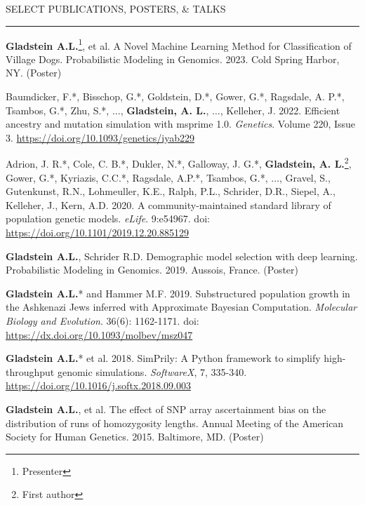 \documentclass{resume} %
\renewenvironment{rSection}[1]{
\sectionskip
\textcolor{RoyalPurple}{\MakeUppercase{#1}}
\sectionlineskip
\hrule
\begin{list}{}{
\setlength{\leftmargin}{1.5em}
}
\item[]
}{
\end{list}
}
\begin{document}
\begin{rSection}{Select Publications, Posters, \& Talks}

    \item \textbf{Gladstein A.L.}\footnote{Presenter}, et al. A Novel Machine Learning Method for Classification of Village Dogs.  Probabilistic Modeling in Genomics. 2023. Cold Spring Harbor, NY. (Poster)

    \item Baumdicker, F.*, Bisschop, G.*, Goldstein, D.*, Gower, G.*, Ragsdale, A. P.*, Tsambos, G.*, Zhu, S.*, $\ldots$, \textbf{Gladstein, A. L.}, $\ldots$, Kelleher, J. 2022. Efficient ancestry and mutation simulation with msprime 1.0. \textit{Genetics}. Volume 220, Issue 3. \url{https://doi.org/10.1093/genetics/iyab229}

    \item Adrion, J. R.*, Cole, C. B.*, Dukler, N.*, Galloway, J. G.*, \textbf{Gladstein, A. L.}\footnote{First author}, Gower, G.*, Kyriazis, C.C.*, Ragsdale, A.P.*, Tsambos, G.*, $\ldots$, Gravel, S., Gutenkunst, R.N., Lohmeuller, K.E., Ralph, P.L., Schrider, D.R., Siepel, A., Kelleher, J., Kern, A.D. 2020. A community-maintained standard library of population genetic models. \textit{eLife}. 9:e54967. doi: \url{https://doi.org/10.1101/2019.12.20.885129}
        
    \item \textbf{Gladstein A.L.}\textsuperscript{\textdagger}, Schrider R.D.  Demographic model selection with deep learning.  Probabilistic Modeling in Genomics. 2019. Aussois, France. (Poster)

    \item \textbf{Gladstein A.L.}* and Hammer M.F. 2019. Substructured population growth in the Ashkenazi Jews inferred with Approximate Bayesian Computation. \textit{Molecular Biology and Evolution}. 36(6): 1162-1171. doi: \url{https://dx.doi.org/10.1093/molbev/msz047}
        
    \item \textbf{Gladstein A.L.}* et al. 2018. SimPrily: A Python framework to simplify high-throughput genomic simulations. \textit{SoftwareX}, 7, 335-340. \url{https://doi.org/10.1016/j.softx.2018.09.003}
                    
    \item \textbf{Gladstein A.L.}\textsuperscript{\textdagger}, et al. The effect of SNP array ascertainment bias on the distribution of runs of homozygosity lengths. Annual Meeting of the American Society for Human Genetics. 2015. Baltimore, MD. (Poster)

\end{rSection}
\end{document}
